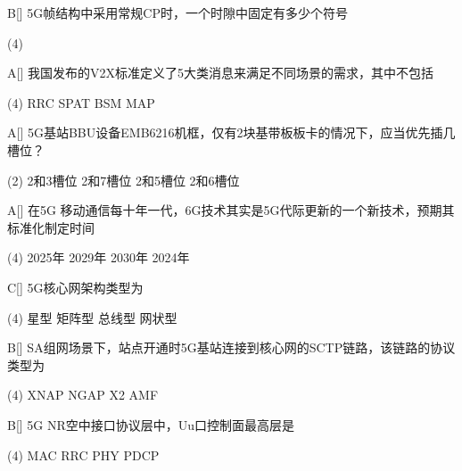 \begin{choice}{B}[]
    5G帧结构中采用常规CP时，一个时隙中固定有多少个符号
    \begin{tasks}(4)
    \end{tasks}
\end{choice}


\begin{choice}{A}[]
    我国发布的V2X标准定义了5大类消息来满足不同场景的需求，其中不包括
    \begin{tasks}(4)
        \task RRC
        \task SPAT
        \task BSM
        \task MAP
    \end{tasks}
\end{choice}


\begin{choice}{A}[]
    5G基站BBU设备EMB6216机框，仅有2块基带板板卡的情况下，应当优先插几槽位？
    \begin{tasks}(2)
        \task 2和3槽位
        \task 2和7槽位
        \task 2和5槽位
        \task 2和6槽位
    \end{tasks}
\end{choice}



\begin{choice}{A}[]
    在5G 移动通信每十年一代，6G技术其实是5G代际更新的一个新技术，预期其标准化制定时间
    \begin{tasks}(4)
        \task 2025年
        \task 2029年
        \task 2030年
        \task 2024年
    \end{tasks}
\end{choice}


\begin{choice}{C}[]
    5G核心网架构类型为
    \begin{tasks}(4)
        \task 星型
        \task 矩阵型
        \task 总线型
        \task 网状型
    \end{tasks}
\end{choice}


\begin{choice}{B}[]
    SA组网场景下，站点开通时5G基站连接到核心网的SCTP链路，该链路的协议类型为

    \begin{tasks}(4)
        \task XNAP
        \task NGAP
        \task X2
        \task AMF
    \end{tasks}
\end{choice}


\begin{choice}{B}[]
    5G NR空中接口协议层中，Uu口控制面最高层是
    \begin{tasks}(4)
        \task MAC
        \task RRC
        \task PHY
        \task PDCP
    \end{tasks}
\end{choice}


